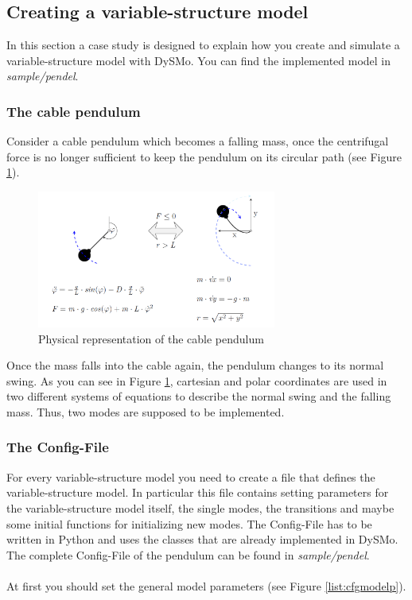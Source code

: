 \subsection{Creating a variable-structure model}
 In this section a case study is designed to explain how you create and simulate a variable-structure model with DySMo. You can find the implemented model in \textit{sample/pendel}.
 
 \subsubsection{The cable pendulum}
 
Consider a cable pendulum which becomes a falling mass, once the centrifugal force is no longer sufficient to keep the pendulum on its circular path (see Figure \ref{fig:pendulum}).
 
 \begin{figure}[htb]
 \centering
 \includegraphics[width=0.7\textwidth,angle=0]{images/GettingStarted/pendulum}
 \caption[Physical representation of the cable pendulum]{Physical representation of the cable pendulum}
 \label{fig:pendulum}
\end{figure}

Once the mass falls into the cable again, the pendulum changes to its normal swing. As you can see in Figure \ref{fig:pendulum}, cartesian and polar coordinates are used in two different systems of equations to describe the normal swing and the falling mass. Thus, two modes are supposed to be implemented.

 \subsubsection{The Config-File}

For every variable-structure model you need to create a file that defines the variable-structure model.
In particular this file contains setting parameters for the variable-structure model itself, the single modes, the transitions and maybe some initial functions for initializing new modes.
The Config-File has to be written in Python and uses the classes that are already implemented in DySMo. The complete Config-File of the pendulum can be found in \textit{sample/pendel}. \\
\\
At first you should set the general model parameters (see Figure \ref{list:cfgmodelp}).

